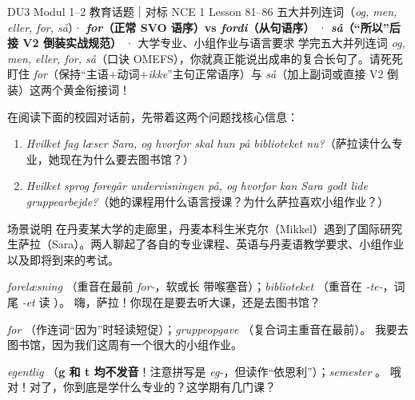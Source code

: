 {DU3 Modul 1--2 教育话题｜对标 NCE 1 Lesson 81--86}
{五大并列连词（\textit{og, men, eller, for, så}）· \textbf{\textit{for}（正常 SVO 语序）vs \textit{fordi}（从句语序）} · \textbf{\textit{så}（“所以”后接 V2 倒装实战规范）} · 大学专业、小组作业与语言要求}
{学完五大并列连词 \textit{og, men, eller, for, så}（口诀 OMEFS），你就真正能说出成串的复合长句了。请死死盯住 \textit{for}（保持“主语+动词+\textit{ikke}”主句正常语序）与 \textit{så}（加上副词或直接 V2 倒装）这两个黄金衔接词！}

\begin{foerduleaeser}
在阅读下面的校园对话前，先带着这两个问题找核心信息：
\begin{enumerate}
  \item \textit{Hvilket fag læser Sara, og hvorfor skal hun på biblioteket nu?}（萨拉读什么专业，她现在为什么要去图书馆？）
  \item \textit{Hvilket sprog foregår undervisningen på, og hvorfor kan Sara godt lide gruppearbejde?}（她的课程用什么语言授课？为什么萨拉喜欢小组作业？）
\end{enumerate}
\end{foerduleaeser}


\begin{tipbox}{场景说明}
在丹麦某大学的走廊里，丹麦本科生米克尔（Mikkel）遇到了国际研究生萨拉（Sara）。两人聊起了各自的专业课程、英语与丹麦语教学要求、小组作业以及即将到来的考试。
\end{tipbox}

{\textit{forelæsning} （重音在最前 \textit{for-}，软或长  带喉塞音）；\textit{biblioteket} （重音在 \textit{-te-}，词尾 \textit{-et} 读 ）。}
{嗨，萨拉！你现在是要去听大课，还是去图书馆？}

{\textit{for} （作连词“因为”时轻读短促）；\textit{gruppeopgave} （复合词主重音在最前）。}
{我要去图书馆，因为我们这周有一个很大的小组作业。}

{\textit{egentlig} （\textbf{g 和 t 均不发音}！注意拼写是 \textit{eg-}，但读作“依恩利”）；\textit{semester} 。}
{哦对！对了，你到底是学什么专业的？这学期有几门课？}

